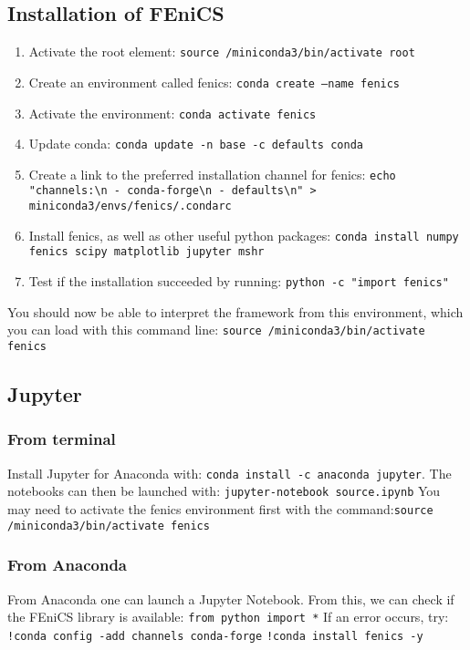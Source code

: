 \documentclass[11pt, oneside]{article}   	%
\begin{document}
\subsection{Installation of FEniCS}
\begin{enumerate}
\item Activate the root element: \texttt{source /miniconda3/bin/activate root}
\item Create an environment called fenics: \texttt{conda create --name fenics}
\item Activate the environment: \texttt{conda activate fenics}
\item Update conda: \texttt{conda update -n base -c defaults conda}
\item Create a link to the preferred installation channel for fenics: \texttt{echo "channels:\textbackslash{}n - conda-forge\textbackslash{}n - defaults\textbackslash{}n" > miniconda3/envs/fenics/.condarc}
\item Install fenics, as well as other useful python packages: \texttt{conda install numpy fenics scipy matplotlib jupyter mshr}
\item Test if the installation succeeded by running: \texttt{python -c "import fenics"}
\end{enumerate}
You should now be able to interpret the framework from this environment, which you can load with this command line: \texttt{source /miniconda3/bin/activate fenics}

\subsection{Jupyter}
\subsubsection{From terminal}
Install Jupyter for Anaconda with: \texttt{conda install -c anaconda jupyter}. \newline
The notebooks can then be launched with: \texttt{jupyter-notebook source.ipynb} \newline
You may need to activate the fenics environment first with the command:\newline \texttt{source /miniconda3/bin/activate fenics} 

\subsubsection{From Anaconda}
From Anaconda one can launch a Jupyter Notebook. From this, we can check if the FEniCS library is available: \texttt{from python import *} \newline
If an error occurs, try:\newline
\texttt{!conda config -add channels conda-forge} \newline
\texttt{!conda install fenics -y}
\end{document}
